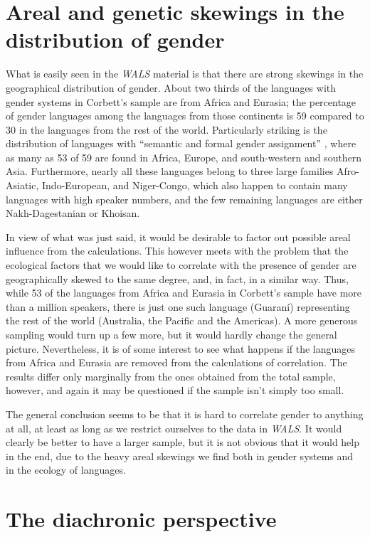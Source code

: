 \documentclass[output=collectionpaper]{langsci/langscibook}
\begin{document}
\section{Areal and genetic skewings in the distribution of gender}

What is easily seen in the \textit{WALS} material is that there are strong skewings in the geographical distribution of gender. About two thirds of the languages with gender systems in Corbett’s sample are from Africa and Eurasia; the percentage of gender languages among the languages from those continents is 59 compared to 30 in the languages from the rest of the world. Particularly striking is the distribution of languages with ``semantic and formal gender assignment'' \citep{Corbett2013b}, where as many as 53 of 59 are found in Africa, Europe, and south-western and southern Asia. Furthermore, nearly all these languages belong to three large families \textendash{} Afro-Asiatic, Indo-European, and Niger-Congo, which also happen to contain many languages with high speaker numbers, and the few remaining languages are either Nakh-Dagestanian or Khoisan.

In view of what was just said, it would be desirable to factor out possible areal influence from the calculations. This however meets with the problem that the ecological factors that we would like to correlate with the presence of gender are geographically skewed to the same degree, and, in fact, in a similar way. Thus, while 53 of the languages from Africa and Eurasia in Corbett’s sample have more than a million speakers, there is just one such language (Guaraní) representing the rest of the world (Australia, the Pacific and the Americas). A more generous sampling would turn up a few more, but it would hardly change the general picture. Nevertheless, it is of some interest to see what happens if the languages from Africa and Eurasia are removed from the calculations of correlation. The results differ only marginally from the ones obtained from the total sample, however, and again it may be questioned if the sample isn’t simply too small.

The general conclusion seems to be that it is hard to correlate gender to anything at all, at least as long as we restrict ourselves to the data in \textit{WALS}. It would clearly be better to have a larger sample, but it is not obvious that it would help in the end, due to the heavy areal skewings we find both in gender systems and in the ecology of languages.

\section{The diachronic perspective}
\end{document}
